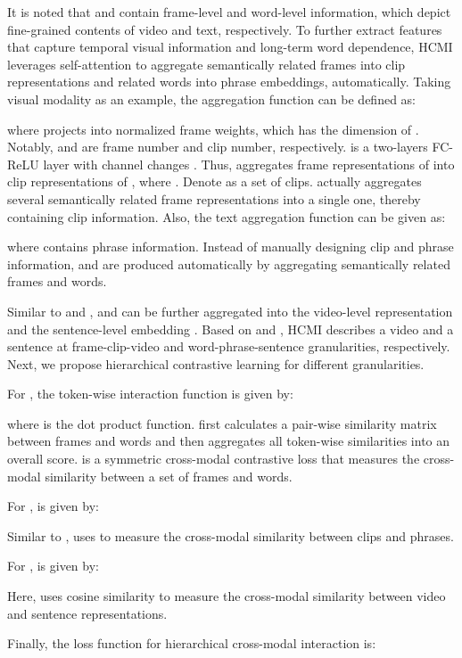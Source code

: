 \documentclass{article}
\begin{document}
It is noted that  and  contain frame-level and word-level information, which depict fine-grained contents of video and text, respectively.
To further extract features that capture temporal visual information and long-term word dependence, HCMI leverages self-attention to aggregate semantically related frames into clip representations and related words into phrase embeddings, automatically.
Taking visual modality as an example, the aggregation function  can be defined as:

where  projects  into normalized frame weights, which has the dimension of .
Notably,  and  are frame number and clip number, respectively.
 is a two-layers FC-ReLU layer with channel changes .
Thus,  aggregates  frame representations of  into  clip representations of , where .
Denote  as a set of  clips.  actually aggregates several semantically related frame representations into a single one, thereby containing clip information.
Also, the text aggregation function  can be given as:

where  contains phrase information.
Instead of manually designing clip and phrase information,  and  are produced automatically by aggregating semantically related frames and words.


Similar to  and ,  and  can be further aggregated into the video-level representation  and the sentence-level embedding .
Based on  and , HCMI describes a video and a sentence at frame-clip-video and word-phrase-sentence granularities, respectively.
Next, we propose hierarchical contrastive learning for different granularities.


For , the token-wise interaction function is given by:



where  is the dot product function.
 first calculates a pair-wise similarity matrix between frames and words and then aggregates all token-wise similarities into an overall score.
 is a symmetric cross-modal contrastive loss that measures the cross-modal similarity between a set of frames and words.

For ,  is given by:

Similar to ,  uses  to measure the cross-modal similarity between clips and phrases.


For ,  is given by:

Here,  uses cosine similarity to measure the cross-modal similarity between video and sentence representations.

Finally, the loss function for hierarchical cross-modal interaction is:
\end{document}
